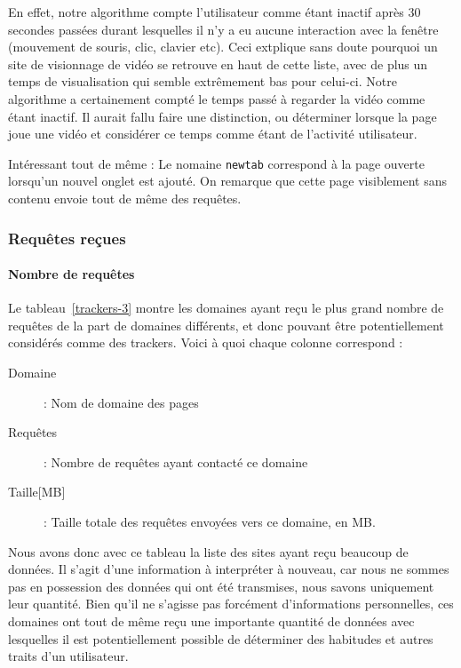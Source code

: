 			En effet, notre algorithme compte l'utilisateur comme étant inactif après 30 secondes passées durant lesquelles il n'y a eu aucune interaction avec la fenêtre (mouvement de souris, clic, clavier etc). Ceci extplique sans doute pourquoi un site de visionnage de vidéo se retrouve en haut de cette liste, avec de plus un temps de visualisation qui semble extrêmement bas pour celui-ci. Notre algorithme a certainement compté le temps passé à regarder la vidéo comme étant inactif. Il aurait fallu faire une distinction, ou déterminer lorsque la page joue une vidéo et considérer ce temps comme étant de l'activité utilisateur.

			Intéressant tout de même : Le nomaine \texttt{newtab} correspond à la page ouverte lorsqu'un nouvel onglet est ajouté. On remarque que cette page visiblement sans contenu envoie tout de même des requêtes.

		\newpage

		\FloatBarrier

		\subsubsection{Requêtes reçues}

			\paragraph{Nombre de requêtes} Le tableau~\ref{trackers-3} montre les domaines ayant reçu le plus grand nombre de requêtes de la part de domaines différents, et donc pouvant être potentiellement considérés comme des trackers. Voici à quoi chaque colonne correspond :
			\begin{description}
				\item[Domaine] : Nom de domaine des pages
				\item[Requêtes] : Nombre de requêtes ayant contacté ce domaine
				\item[Taille{[}MB{]}] : Taille totale des requêtes envoyées vers ce domaine, en MB.
			\end{description}

			Nous avons donc avec ce tableau la liste des sites ayant reçu beaucoup de données. Il s'agit d'une information à interpréter à nouveau, car nous ne sommes pas en possession des données qui ont été transmises, nous savons uniquement leur quantité. Bien qu'il ne s'agisse pas forcément d'informations personnelles, ces domaines ont tout de même reçu une importante quantité de données avec lesquelles il est potentiellement possible de déterminer des habitudes et autres traits d'un utilisateur.

